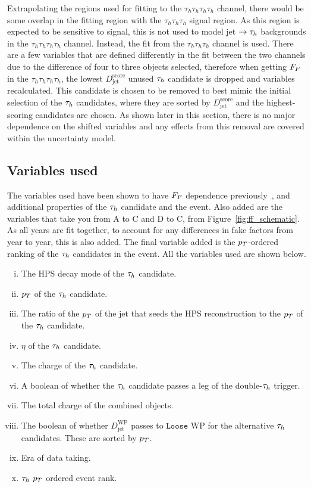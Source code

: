 Extrapolating the regions used for fitting to the $\tau_h \tau_h \tau_h \tau_h$ channel, there would be some overlap in the fitting region with the $\tau_h \tau_h \tau_h$ signal region. 
As this region is expected to be sensitive to signal, this is not used to model jet $\rightarrow\tau_{h}$ backgrounds in the $\tau_h \tau_h \tau_h \tau_h$ channel. 
Instead, the fit from the $\tau_h \tau_h \tau_h$ channel is used. 
There are a few variables that are defined differently in the fit between the two channels due to the difference of four to three objects selected, therefore when getting $F_{F}$ in the $\tau_h \tau_h \tau_h \tau_h$, the lowest $D_{\text{jet}}^{\text{score}}$ unused $\tau_{h}$ candidate is dropped and variables recalculated. 
This candidate is chosen to be removed to best mimic the initial selection of the $\tau_{h}$ candidates, where they are sorted by $D_{\text{jet}}^{\text{score}}$ and the highest-scoring candidates are chosen. 
As shown later in this section, there is no major dependence on the shifted variables and any effects from this removal are covered within the uncertainty model. \\

\subsection{Variables used}

The variables used have been shown to have $F_{F}$ dependence previously~\cite{CMS:2020rpr,CMS:2022rbd}, and additional properties of the $\tau_{h}$ candidate and the event. 
Also added are the variables that take you from A to C and D to C, from Figure~\ref{fig:ff_schematic}. 
As all years are fit together, to account for any differences in fake factors from year to year, this is also added. 
The final variable added is the $p_{T}$-ordered ranking of the $\tau_{h}$ candidates in the event.
All the variables used are shown below.

\begin{enumerate}[i)]
\item The \ac{HPS} decay mode of the $\tau_{h}$ candidate.
\item $p_{T}$ of the $\tau_{h}$ candidate.
\item The ratio of the $p_{T}$ of the jet that seeds the \ac{HPS} reconstruction to the $p_{T}$ of the $\tau_{h}$ candidate.
\item $\eta$ of the $\tau_{h}$ candidate.
\item The charge of the $\tau_{h}$ candidate.
\item A boolean of whether the $\tau_{h}$ candidate passes a leg of the double-$\tau_{h}$ trigger.
\item The total charge of the combined objects.
\item The boolean of whether $D_{\text{jet}}^{\text{WP}}$ passes to $\texttt{Loose}$ WP for the alternative $\tau_{h}$ candidates. These are sorted by $p_{T}$.
\item Era of data taking.
\item $\tau_{h}$ $p_{T}$ ordered event rank.
\end{enumerate}

